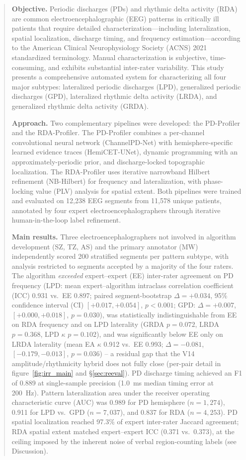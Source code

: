 \documentclass{iopjournal}
\begin{document}
\begin{abstract}
\textbf{Objective.} Periodic discharges (PDs) and rhythmic delta activity (RDA) are common electroencephalographic (EEG) patterns in critically ill patients that require detailed characterization---including lateralization, spatial localization, discharge timing, and frequency estimation---according to the American Clinical Neurophysiology Society (ACNS) 2021 standardized terminology. Manual characterization is subjective, time-consuming, and exhibits substantial inter-rater variability. This study presents a comprehensive automated system for characterizing all four major subtypes: lateralized periodic discharges (LPD), generalized periodic discharges (GPD), lateralized rhythmic delta activity (LRDA), and generalized rhythmic delta activity (GRDA).

\textbf{Approach.} Two complementary pipelines were developed: the PD-Profiler and the RDA-Profiler. The PD-Profiler combines a per-channel convolutional neural network (ChannelPD-Net) with hemisphere-specific learned evidence traces (HemiCET-UNet), dynamic programming with an approximately-periodic prior, and discharge-locked topographic localization. The RDA-Profiler uses iterative narrowband Hilbert refinement (NB-Hilbert) for frequency and lateralization, with phase-locking value (PLV) analysis for spatial extent. Both pipelines were trained and evaluated on 12,238 EEG segments from 11,578 unique patients, annotated by four expert electroencephalographers through iterative human-in-the-loop label refinement.

\textbf{Main results.} Three electroencephalographers not involved in algorithm development (SZ, TZ, AS) and the primary annotator (MW) independently scored 200 stratified segments per pattern subtype, with analysis restricted to segments accepted by a majority of the four raters. The algorithm \emph{exceeded} expert--expert (EE) inter-rater agreement on PD frequency (LPD: mean expert--algorithm intraclass correlation coefficient (ICC) 0.931 vs.\ EE 0.897; paired segment-bootstrap $\Delta=+0.034$, 95\% confidence interval (CI) $[+0.017, +0.054]$, $p<0.001$; GPD: $\Delta=+0.007$, $[+0.000, +0.018]$, $p=0.030$), was statistically indistinguishable from EE on RDA frequency and on LPD laterality (GRDA $p=0.072$, LRDA $p=0.368$, LPD $\kappa$ $p=0.102$), and was significantly below EE only on LRDA laterality (mean EA $\kappa$ 0.912 vs.\ EE 0.993; $\Delta=-0.081$, $[-0.179,-0.013]$, $p=0.036$) -- a residual gap that the V14 amplitude/rhythmicity hybrid does not fully close (per-pair detail in figure~\ref{fig:irr_main} and \S\ref{sec:reeval}). PD discharge timing achieved an F1 of 0.889 at single-sample precision (1.0~ms median timing error at 200~Hz). Pattern lateralization area under the receiver operating characteristic curve (AUC) was 0.989 for PD hemisphere ($n = 1{,}274$), 0.911 for LPD vs.\ GPD ($n = 7{,}037$), and 0.837 for RDA ($n = 4{,}253$). PD spatial localization reached 97.3\% of expert inter-rater Jaccard agreement; RDA spatial extent matched expert--expert ICC (0.371 vs.\ 0.373), at the ceiling imposed by the inherent noise of verbal region-counting labels (see Discussion).


\end{abstract}
\end{document}
